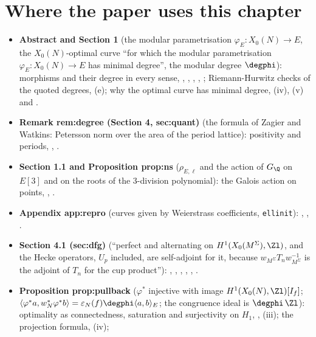 \section*{Where the paper uses this chapter}

\begin{itemize}
\item \textbf{Abstract and Section 1} (the modular parametrisation $\varphi_E\colon X_0(N)\to E$, the $X_0(N)$-optimal curve ``for which the modular parametrisation $\varphi_E\colon X_0(N)\to E$ has minimal degree'', the modular
degree $\degphi$): morphisms and their degree in every sense, , , , ,
; Riemann-Hurwitz checks of the quoted degrees, (e); why the optimal curve has minimal degree,
(iv), (v) and .
\item \textbf{Remark rem:degree (Section 4, sec:quant)} (the formula of Zagier and Watkins: Petersson norm over the area of the period lattice): positivity and periods, ,
.
\item \textbf{Section 1.1 and Proposition prop:ns} ($\rho_{E,\ell}$ and the action of $G_\Q$ on $E[3]$ and on the roots of the $3$-division polynomial): the Galois action on points,
, .
\item \textbf{Appendix app:repro} (curves given by Weierstrass coefficients, \texttt{ellinit}): , ,
.
\item \textbf{Section 4.1 (sec:dfg)} (``perfect and alternating on $H^1(X_0(M^\Sigma),\Zl)$, and the Hecke operators, $U_p$ included, are self-adjoint for it, because $w_{M^\Sigma}T_nw_{M^\Sigma}^{-1}$ is the adjoint of
$T_n$ for the cup product''): , , , ,
, .
\item \textbf{Proposition prop:pullback} ($\varphi^*$ injective with image $H^1(X_0(N),\Zl)[I_f]$; $\langle\varphi^*a,w_N^*\varphi^*b\rangle=\varepsilon_N(f)\degphi\langle a,b\rangle_E$; the congruence ideal is $\degphi\,\Zl$):
optimality as connectedness, saturation and surjectivity on $H_1$, , (iii); the projection formula, (iv);

\end{itemize}
